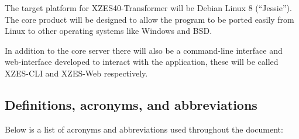 The target platform for XZES40-Transformer will be Debian Linux 8 (``Jessie'').
The core product will be designed to allow the program to be ported easily from Linux to other operating systems like Windows and BSD.

In addition to the core server there will also be a command-line interface and web-interface developed to interact with the application, these will be called XZES-CLI and XZES-Web respectively.


\subsection{Definitions, acronyms, and abbreviations}

Below is a list of acronyms and abbreviations used throughout the document:


